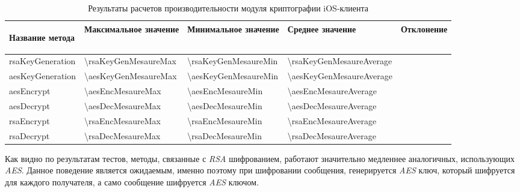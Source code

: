 \begin{table}[!ht]
  \caption{Результаты расчетов производительности модуля криптографии iOS-клиента}
  \label{sec:eng:performance:aesenc:result}
  \centering
  \begin{tabularx}{\linewidth}{
    |>{\hsize}X|
    >{\centering\arraybackslash{}\hsize}X|
    >{\centering\arraybackslash{}\hsize}X|
    >{\centering\arraybackslash{}\hsize}X|
  }
	\hline
 \begin{center}Название метода\end{center} & Максимальное значение &  Минимальное значение &  Среднее значение & Отклонение \\
 \hline
 rsaKeyGeneration & \num{\rsaKeyGenMesaureMax} & \num{\rsaKeyGenMesaureMin} & \num{\rsaKeyGenMesaureAverage} \\
 \hline
 aesKeyGeneration & \num{\aesKeyGenMesaureMax} & \num{\aesKeyGenMesaureMin} & \num{\aesKeyGenMesaureAverage} \\
 \hline
 aesEncrypt & \num{\aesEncMesaureMax} & \num{\aesEncMesaureMin} & \num{\aesEncMesaureAverage} \\
 \hline
 aesDecrypt & \num{\aesDecMesaureMax} & \num{\aesDecMesaureMin} & \num{\aesDecMesaureAverage} \\
 \hline
 rsaEncrypt & \num{\rsaEncMesaureMax} & \num{\rsaEncMesaureMin} & \num{\rsaEncMesaureAverage} \\
 \hline
 rsaDecrypt & \num{\rsaDecMesaureMax} & \num{\rsaDecMesaureMin} & \num{\rsaDecMesaureAverage} \\
 \hline
  \end{tabularx}
\end{table}

Как видно по результатам тестов, методы, связанные с \textit{RSA} шифрованием, работают значительно медленнее аналогичных, использующих \textit{AES}. Данное поведение является ожидаемым, именно поэтому при шифровании сообщения, генерируется \textit{AES} ключ, который шифруется для каждого получателя, а само сообщение шифруется \textit{AES} ключом.